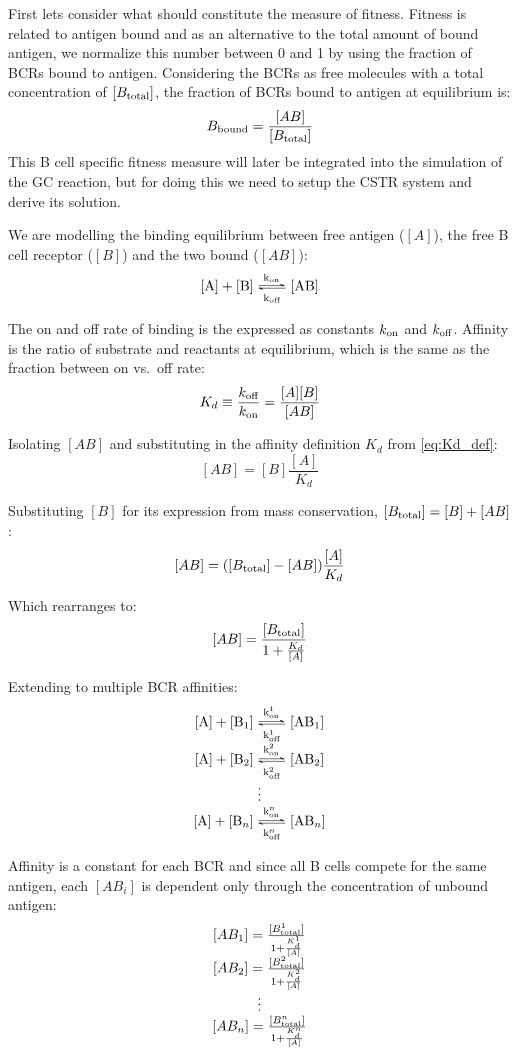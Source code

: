 First lets consider what should constitute the measure of fitness.
Fitness is related to antigen bound and as an alternative to the total amount of bound antigen, we normalize this number between 0 and 1 by using the fraction of BCRs bound to antigen.
Considering the BCRs as free molecules with a total concentration of $[B_{\text{total}}]$, the fraction of BCRs bound to antigen at equilibrium is:
$$
B_{\text{bound}} = \frac{[AB]}{[B_{\text{total}}]}
$$
This B cell specific fitness measure will later be integrated into the simulation of the GC reaction, but for doing this we need to setup the CSTR system and derive its solution.


\noindent
We are modelling the binding equilibrium between free antigen ($[A]$), the free B cell receptor ($[B]$) and the two bound ($[AB]$):
\begin{equation}
\ce{[A] + [B] <=>[k_{\on}][k_{\off}] [AB]}
  \label{eq:bind1}
\end{equation}

\noindent
The on and off rate of binding is the expressed as constants $k_{\text{on}}$ and $k_{\text{off}}$. Affinity is the ratio of substrate and reactants at equilibrium, which is the same as the fraction between on vs.\ off rate:
\begin{equation}
K_d \equiv \frac{k_{\text{off}}}{k_{\text{on}}} = \frac{[A] [B]}{[AB]}
  \label{eq:Kd_def}
\end{equation}

\noindent
Isolating $[AB]$ and substituting in the affinity definition $K_d$ from \eqref{eq:Kd_def}:
$$
[AB] = [B] \frac{[A]}{K_d}
$$

\noindent
Substituting $[B]$ for its expression from mass conservation, $[B_{\text{total}}] = [B] + [AB]$:
$$
[AB] = ([B_{\text{total}}] - [AB]) \frac{[A]}{K_d}
$$

\noindent
Which rearranges to:
$$
[AB] = \frac{[B_{\text{total}}]}{1 + \frac{K_d}{[A]}}
$$

\noindent
Extending to multiple BCR affinities:
\[
 \begin{matrix}
  \ce{[A] + [B_1] <=>[k^1_{\on}][k^1_{\off}] [AB_1]} \\
  \ce{[A] + [B_2] <=>[k^2_{\on}][k^2_{\off}] [AB_2]} \\
  \vdots \\
  \ce{[A] + [B_n] <=>[k^n_{\on}][k^n_{\off}] [AB_n]}
  \label{eq:ABi}
 \end{matrix}
\]

\noindent
Affinity is a constant for each BCR and since all B cells compete for the same antigen, each $[AB_i]$ is dependent only through the concentration of unbound antigen:
\[
 \begin{matrix}
  [AB_1] = \frac{[B^1_{\text{total}}]}{1 + \frac{K^1_d}{[A]}} \\
  [AB_2] = \frac{[B^2_{\text{total}}]}{1 + \frac{K^2_d}{[A]}} \\
  \vdots \\
  [AB_n] = \frac{[B^n_{\text{total}}]}{1 + \frac{K^n_d}{[A]}} \\
 \end{matrix}
\]

